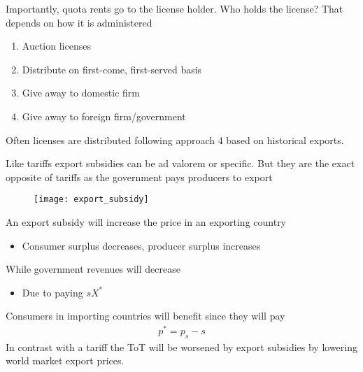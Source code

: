 \documentclass{beamer}
\begin{document}
\begin{frame}
 Importantly, quota rents go to the license holder. 
 Who holds the license? That depends on how it is administered
 \begin{enumerate}
   \item Auction licenses
   \item Distribute on first-come, first-served basis
   \item Give away to domestic firm
   \item Give away to foreign firm/government   
 \end{enumerate}
 \medskip
 Often licenses are distributed following approach 4 based on historical exports.
\end{frame}

\begin{frame}
  Like tariffs export subsidies can be ad valorem or specific.
  But they are the exact opposite of tariffs as the government pays producers to export
  \begin{figure}
    \texttt{[image: export\_subsidy]}
  \end{figure}
\end{frame}

\begin{frame}
  An export subsidy will increase the price in an exporting country
  \begin{itemize}
    \item Consumer surplus decreases, producer surplus increases
  \end{itemize}
  \medskip
  While government revenues will decrease
  \begin{itemize}
    \item Due to paying $sX^*$
  \end{itemize}
  Consumers in importing countries will benefit since they will pay
  \begin{align*}
  p^*=p_s-s
  \end{align*}   
  \medskip
  In contrast with a tariff the ToT will be worsened by export subsidies by lowering world market export prices.
\end{frame}
\end{document}
